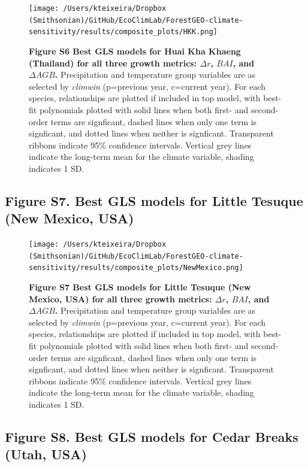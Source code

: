 \documentclass[
]{article}
\begin{document}
\begin{figure}
\centering
\texttt{[image: /Users/kteixeira/Dropbox (Smithsonian)/GitHub/EcoClimLab/ForestGEO-climate-sensitivity/results/composite\_plots/HKK.png]}
\caption{\textbf{Figure S6 \textbar{} Best GLS models for Huai Kha
Khaeng (Thailand) for all three growth metrics: \(\Delta r\), \(BAI\),
and \(\Delta AGB\).} Precipitation and temperature group variables are
as selected by \emph{climwin} (p=previous year, c=current year). For
each species, relationships are plotted if included in top model, with
best-fit polynomials plotted with solid lines when both first- and
second-order terms are signficant, dashed lines when only one term is
signficant, and dotted lines when neither is signficant. Transparent
ribbons indicate 95\% confidence intervals. Vertical grey lines indicate
the long-term mean for the climate variable, shading indicates 1 SD.}
\end{figure}

\newpage

\hypertarget{figure-s7.-best-gls-models-for-little-tesuque-new-mexico-usa}{%
\subsection{Figure S7. Best GLS models for Little Tesuque (New Mexico,
USA)}\label{figure-s7.-best-gls-models-for-little-tesuque-new-mexico-usa}}

\begin{figure}
\centering
\texttt{[image: /Users/kteixeira/Dropbox (Smithsonian)/GitHub/EcoClimLab/ForestGEO-climate-sensitivity/results/composite\_plots/NewMexico.png]}
\caption{\textbf{Figure S7 \textbar{} Best GLS models for Little Tesuque
(New Mexico, USA) for all three growth metrics: \(\Delta r\), \(BAI\),
and \(\Delta AGB\).} Precipitation and temperature group variables are
as selected by \emph{climwin} (p=previous year, c=current year). For
each species, relationships are plotted if included in top model, with
best-fit polynomials plotted with solid lines when both first- and
second-order terms are signficant, dashed lines when only one term is
signficant, and dotted lines when neither is signficant. Transparent
ribbons indicate 95\% confidence intervals. Vertical grey lines indicate
the long-term mean for the climate variable, shading indicates 1 SD.}
\end{figure}

\newpage

\hypertarget{figure-s8.-best-gls-models-for-cedar-breaks-utah-usa}{%
\subsection{Figure S8. Best GLS models for Cedar Breaks (Utah,
USA)}\label{figure-s8.-best-gls-models-for-cedar-breaks-utah-usa}}
\end{document}
